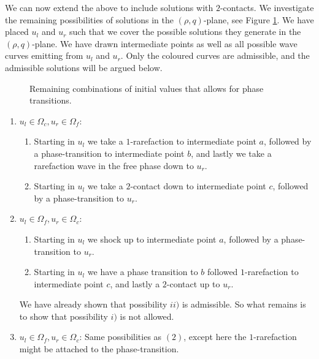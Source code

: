 \documentclass[10pt]{article}
\numberwithin{equation}{section}
\begin{document}
We can now extend the above to include solutions with $2$-contacts. We investigate the remaining possibilities of solutions in the $(\rho, q)$-plane, see Figure \ref{fig:remainingPossibilities}. We have placed $u_l$ and $u_r$ such that we cover the possible solutions they generate in the $(\rho, q)$-plane. We have drawn intermediate points as well as all possible wave curves emitting from $u_l$ and $u_r$. Only the coloured curves are admissible, and the admissible solutions will be argued below.
\begin{figure}
    \centering
    
    \caption{Remaining combinations of initial values that allows for phase transitions.}
    \label{fig:remainingPossibilities}
\end{figure}

\begin{enumerate}[label=\textsc{(\arabic*):}, wide]
    \item $u_l \in \Omega_c, u_r \in \Omega_f$:
    \begin{enumerate} [label=\textit{Possibility \roman*):}, wide]
    \item Starting in $u_l$ we take a $1$-rarefaction to intermediate point $a$, followed by a phase-transition to intermediate point $b$, and lastly we take a rarefaction wave in the free phase down to $u_r$.
    \item Starting in $u_l$ we take a $2$-contact down to intermediate point $c$, followed by a phase-transition to $u_r$.
    \end{enumerate}
    
     \item $u_l \in \Omega_f, u_r \in \Omega_c$:
    \begin{enumerate} [label=\textit{Possibility \roman*):}, wide]
    \item Starting in $u_l$ we shock up to intermediate point $a$, followed by a phase-transition to $u_r$.
    \item Starting in $u_l$ we have a phase transition to $b$ followed $1$-rarefaction to intermediate point $c$, and lastly a $2$-contact up to $u_r$.
    \end{enumerate}
    We have already shown that possibility $ii)$ is admissible. So what remains is to show that possibility $i)$ is not allowed.
    
    \item $u_l \in \Omega_f, u_r \in \Omega_c$: \newline
    Same possibilities as $(2)$, except here the $1$-rarefaction might be attached to the phase-transition. 
    

\end{enumerate}
\end{document}
